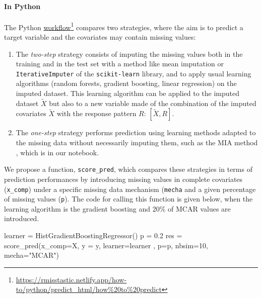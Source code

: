 \paragraph*{In {Python}} The {Python} \href{https://rmisstastic.netlify.app/how-to/python/predict_html/how\%20to\%20predict}{workflow}\footnote{\url{https://rmisstastic.netlify.app/how-to/python/predict_html/how\%20to\%20predict}} compares two strategies, where the aim is to predict a target variable and the covariates may contain missing values:
\begin{enumerate}
    \item The \textit{two-step} strategy consists of imputing the missing values both in the training and in the test set with a method like mean imputation or \texttt{IterativeImputer} of the \texttt{scikit-learn} library, and to apply usual learning algorithms (random forests, gradient boosting, linear regression) on the imputed dataset.
    This learning algorithm can be applied to the imputed dataset $\tilde{X}$ but also to a new variable made of the combination of the imputed covariates $\tilde{X}$ with the response pattern $R$: $[\tilde{X},R]$. 
    \item The \textit{one-step} strategy performs prediction using learning methods adapted to the missing data without necessarily imputing them, such as the MIA method \citep{twala2008good}, which is in our notebook.
\end{enumerate}



We propose a function, \texttt{score\_pred}, which compares these strategies in terms of prediction performances by introducing missing values in complete covariates (\texttt{x\_comp}) under a specific missing data mechanism (\texttt{mecha} and a given percentage of missing values (\texttt{p}). The code for calling this function is given below, when the learning algorithm is the gradient boosting and 20\% of MCAR values are introduced.

\begin{example}
learner = HistGradientBoostingRegressor() 
p = 0.2
res = score_pred(x_comp=X, y = y, learner=learner , p=p, nbsim=10, mecha="MCAR")
\end{example}

